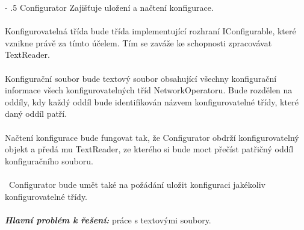 \documentclass[12pt]{article}
\makeatletter
\newcommand\nodeconf{Configurator}
\renewcommand\paragraph{%
    \@startsection{paragraph}{4}{0mm}%
       {-\baselineskip}%
       {.5\baselineskip}%
       {\normalfont\normalsize\bfseries}}
\makeatother
\begin{document}
\paragraph{\nodeconf} 
Zajišťuje uložení a načtení konfigurace.\\\\
Konfigurovatelná třída bude třída implementující rozhraní IConfigurable, které vznikne právě za tímto účelem. Tím se zaváže ke schopnosti zpracovávat TextReader.\\\\
Konfigurační soubor bude textový soubor obsahující všechny konfigurační informace všech konfigurovatelných tříd NetworkOperatoru. Bude rozdělen na oddíly, kdy každý oddíl bude identifikován názvem konfigurovatelné třídy, které daný oddíl patří.\\\\
Načtení konfigurace bude fungovat tak, že Configurator obdrží konfigurovatelný objekt a předá mu TextReader, ze kterého si bude moct přečíst patřičný oddíl konfiguračního souboru.\\\\\
Configurator bude umět také na požádání uložit konfiguraci jakékoliv konfigurovatelné třídy.\\\\
\textbf{\textit{Hlavní problém k řešení:}} práce s textovými soubory.
\end{document}
